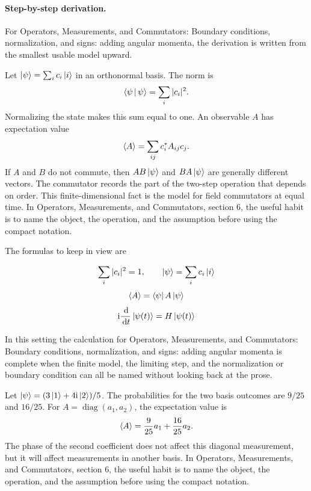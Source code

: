 \paragraph{Step-by-step derivation.}

For Operators, Measurements, and Commutators: Boundary conditions, normalization, and signs: adding angular momenta, the derivation is written from the smallest usable model upward.

Let \(\left|\psi\right\rangle=\sum_i c_i\left|i\right\rangle\) in an orthonormal basis.  The norm is
\[
  \left\langle \psi\,\middle|\,\psi\right\rangle=\sum_i |c_i|^2.
\]
Normalizing the state makes this sum equal to one.  An observable \(A\) has expectation value
\[
  \left\langle A\right\rangle=\sum_{ij}c_i^*A_{ij}c_j.
\]
If \(A\) and \(B\) do not commute, then \(AB\left|\psi\right\rangle\) and \(BA\left|\psi\right\rangle\) are generally different vectors.  The commutator records the part of the two-step operation that depends on order.  This finite-dimensional fact is the model for field commutators at equal time.  In Operators, Measurements, and Commutators, section 6, the useful habit is to name the object, the operation, and the assumption before using the compact notation.

The formulas to keep in view are

\[
  \sum_i |c_i|^2=1,\qquad \left|\psi\right\rangle=\sum_i c_i\left|i\right\rangle
\]
\[
  \left\langle A\right\rangle=\left\langle \psi\right|A\left|\psi\right\rangle
\]
\[
  \mathrm i\frac{\,\mathrm d}{\,\mathrm d t}\left|\psi(t)\right\rangle=H\left|\psi(t)\right\rangle
\]

In this setting the calculation for Operators, Measurements, and Commutators: Boundary conditions, normalization, and signs: adding angular momenta is complete when the finite model, the limiting step, and the normalization or boundary condition can all be named without looking back at the prose.




\begin{example}
Let \(\left|\psi\right\rangle=(3\left|1\right\rangle+4\mathrm i\left|2\right\rangle)/5\).  The probabilities for the two basis outcomes are \(9/25\) and \(16/25\).  For \(A=\operatorname{diag}(a_1,a_2)\), the expectation value is
\[
  \left\langle A\right\rangle=\frac{9}{25}a_1+\frac{16}{25}a_2.
\]
The phase of the second coefficient does not affect this diagonal measurement, but it will affect measurements in another basis.  In Operators, Measurements, and Commutators, section 6, the useful habit is to name the object, the operation, and the assumption before using the compact notation.
\end{example}



